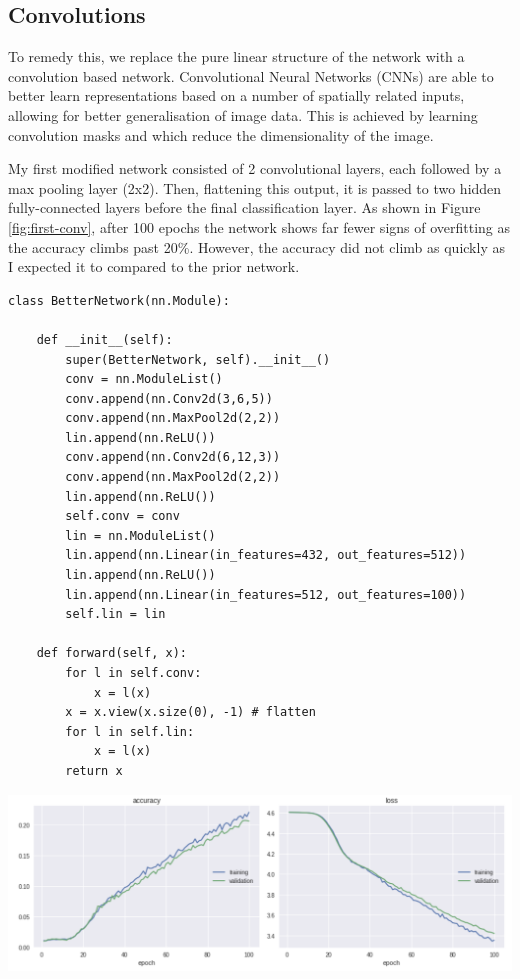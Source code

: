 \documentclass[11pt]{article}
\begin{document}
\subsection{Convolutions}

To remedy this, we replace the pure linear structure of the network with a convolution based network. Convolutional Neural Networks (CNNs) are able to better learn representations based on a number of spatially related inputs, allowing for better generalisation of image data. This is achieved by learning convolution masks and which reduce the dimensionality of the image. 

My first modified network consisted of 2 convolutional layers, each followed by a max pooling layer (2x2). Then, flattening this output, it is passed to two hidden fully-connected layers before the final classification layer. As shown in Figure \ref{fig:first-conv}, after 100 epochs the network shows far fewer signs of overfitting as the accuracy climbs past 20\%. However, the accuracy did not climb as quickly as I expected it to compared to the prior network.

\begin{small}
\begin{verbatim}
class BetterNetwork(nn.Module):

    def __init__(self):
        super(BetterNetwork, self).__init__()
        conv = nn.ModuleList()
        conv.append(nn.Conv2d(3,6,5))
        conv.append(nn.MaxPool2d(2,2))
        lin.append(nn.ReLU())
        conv.append(nn.Conv2d(6,12,3))
        conv.append(nn.MaxPool2d(2,2))
        lin.append(nn.ReLU())
        self.conv = conv
        lin = nn.ModuleList()
        lin.append(nn.Linear(in_features=432, out_features=512))
        lin.append(nn.ReLU())
        lin.append(nn.Linear(in_features=512, out_features=100))
        self.lin = lin

    def forward(self, x):
        for l in self.conv:
            x = l(x)
        x = x.view(x.size(0), -1) # flatten
        for l in self.lin:
            x = l(x)
        return x
\end{verbatim}
\end{small}


    \begin{center}
        \begin{minipage}{0.75\linewidth}
            \includegraphics[width=\linewidth]{accuracy1}
            \label{fig:first-conv}
        \end{minipage}%
    \end{center}
    
\end{document}
